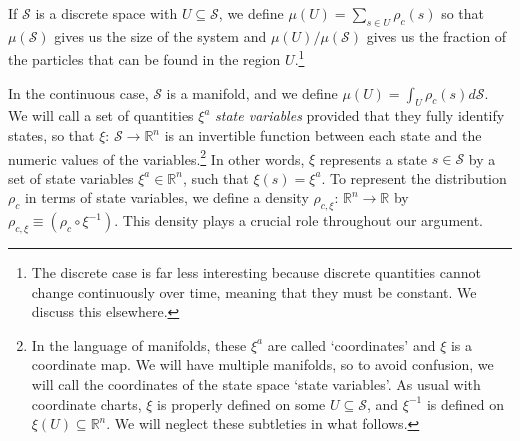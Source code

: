 \documentclass[12pt, english, twoside]{article} %
\begin{document}
If $\mathcal{S}$ is a discrete space with $U \subseteq \mathcal{S}$, we define $\mu(U) = \sum\limits_{s \in U} \rho_c(s)$ so that $\mu(\mathcal{S})$ gives us the size of the system and $\mu(U)/\mu(\mathcal{S})$ gives us the fraction of the particles that can be found in the region $U$.\footnote{The discrete case is far less interesting because discrete quantities cannot change continuously over time, meaning that they must be constant. We discuss this elsewhere.}


In the continuous case, $\mathcal{S}$ is a manifold, and we define $\mu(U) = \int_U \rho_c(s) d\mathcal{S} $. We will call a set of quantities $\xi^a$ \textit{state variables} provided that they fully identify states, so that $\xi$: $\mathcal{S} \to \mathbb{R}^n$ is an invertible function between each state and the numeric values of the variables.\footnote{In the language of manifolds, these $\xi^a$ are called `coordinates' and $\xi$ is a coordinate map. We will have multiple manifolds, so to avoid confusion, we will call the coordinates of the state space `state variables'. As usual with coordinate charts, $\xi$ is properly defined on some $U \subseteq \mathcal{S}$, and $\xi^{-1}$ is defined on $\xi(U) \subseteq \mathbb{R}^n$. We will neglect these subtleties in what follows.} In other words, $\xi$ represents a state $s \in \mathcal{S}$ by a set of state variables $\xi^a \in \mathbb{R}^n$, such that $\xi (s) = \xi^a$. To represent the distribution $\rho_c$ in terms of state variables, we define a density $\rho_{c, \xi}$: $\mathbb{R}^n \to \mathbb{R}$ by $\rho_{c, \xi} \equiv (\rho_c \circ \xi^{-1})$. This density plays a crucial role throughout our argument. 
\end{document}

